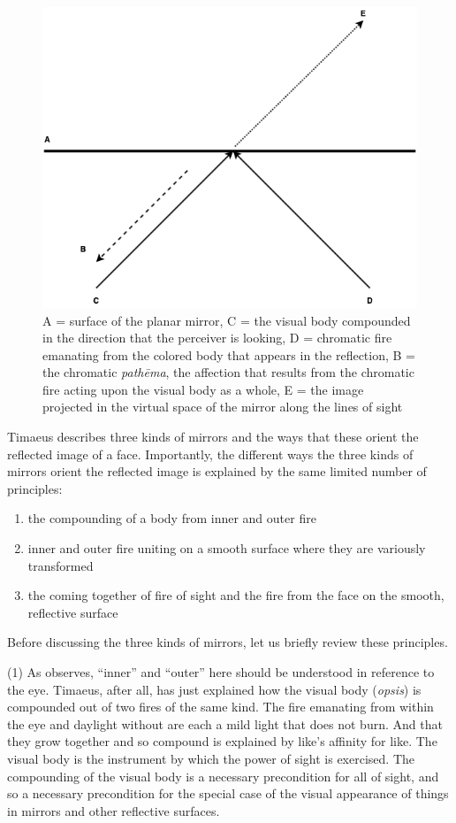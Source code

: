\begin{figure}[htbp]
	\centering
		\includegraphics[scale=0.4]{graphics/mirror_z.png}
	\caption{A = surface of the planar mirror, C = the visual body compounded in the direction that the perceiver is looking, D = chromatic fire emanating from the colored body that appears in the reflection, B = the chromatic \emph{pathēma}, the affection that results from the chromatic fire acting upon the visual body as a whole, E = the image projected in the virtual space of the mirror along the lines of sight}
	\label{fig:mirror_z}
\end{figure}

Timaeus describes three kinds of mirrors and the ways that these orient the reflected image of a face. Importantly, the different ways the three kinds of mirrors orient the reflected image is explained by the same limited number of principles:
\begin{enumerate}[(1)]
	\item the compounding of a body from inner and outer fire
	\item inner and outer fire uniting on a smooth surface where they are variously transformed
	\item the coming together of fire of sight and the fire from the face on the smooth, reflective surface
\end{enumerate}
Before discussing the three kinds of mirrors, let us briefly review these principles.

(1) As \citet[154]{Cornford:1935fk} observes, ``inner'' and ``outer'' here should be understood in reference to the eye. Timaeus, after all, has just explained how the visual body (\emph{opsis}) is compounded out of two fires of the same kind. The fire emanating from within the eye and daylight without are each a mild light that does not burn. And that they grow together and so compound is explained by like's affinity for like. The visual body is the instrument by which the power of sight is exercised. The compounding of the visual body is a necessary precondition for all of sight, and so a necessary precondition for the special case of the visual appearance of things in mirrors and other reflective surfaces.


